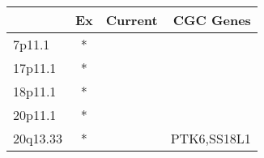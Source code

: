 \begin{tabular}{lccr}
\toprule
{} & Ex & Current &    CGC Genes \\
\midrule
7p11.1   &  * &         &              \\
17p11.1  &  * &         &              \\
18p11.1  &  * &         &              \\
20p11.1  &  * &         &              \\
20q13.33 &  * &         &  PTK6,SS18L1 \\
\bottomrule
\end{tabular}
